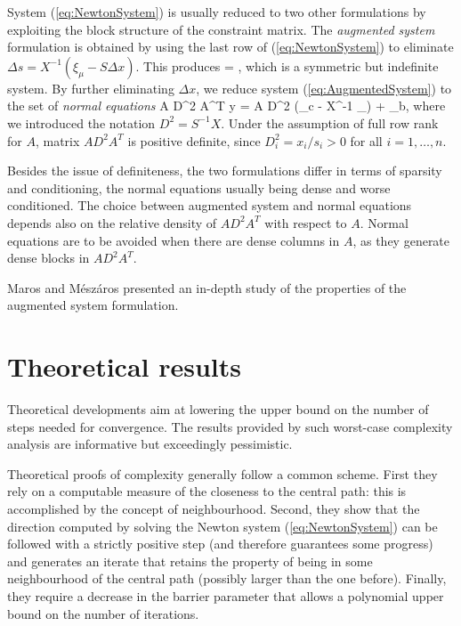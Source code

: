 System (\ref{eq:NewtonSystem}) is usually reduced to two other
formulations by exploiting the block structure of the constraint
matrix.
%
The {\em augmented system} formulation is obtained by using 
the last row of (\ref{eq:NewtonSystem}) to eliminate
$\Delta s = X^{-1} (\xi_\mu - S\Delta x)$.
This produces
%
\be \label{eq:AugmentedSystem}
\left[ \begin{array}{cc}
    -X^{-1}S & A^T \\ A & 0
  \end{array} \right]
 =
\left[ \begin{array}{c}
    \xi_c - X^{-1}\xi_\mu \\ \xi_b
   \end{array} \right],
\ee
which is a symmetric but indefinite system.
%
By further eliminating $\Delta x$, we reduce system 
(\ref{eq:AugmentedSystem}) to the set of {\em normal equations}
%
\be \label{eq:NormalEquations}
  A D^2 A^T \Delta y = A D^2 (\xi_c - X^{-1} \xi_\mu) + \xi_b,
\ee
%
where we introduced the notation $D^2 = S^{-1} X$.
Under the assumption of full row rank for $A$, matrix 
$A D^2 A^T$ is positive definite, since $D^2_i = x_i/s_i > 0$ for
all $i = 1, \ldots, n$.

Besides the issue of definiteness, the two formulations differ in
terms of sparsity and conditioning, the normal equations usually 
being dense and worse conditioned.
The choice between augmented system and normal equations depends also on 
the relative density of $AD^2A^T$ with respect to $A$.
Normal equations are to be avoided when there are dense columns in $A$, 
as they generate dense blocks in $AD^2A^T$.

Maros and M\'esz\'aros \cite{MarosMeszaros} presented an in-depth 
study of the properties of the augmented system formulation.

%
%
\section{Theoretical results}
\label{sec:TheoreticalResults}

Theoretical developments aim at lowering the upper bound on the number 
of steps needed for convergence. The results provided by such worst-case 
complexity analysis are informative but exceedingly pessimistic. 

Theoretical proofs of complexity generally follow a common scheme.
First they rely on a computable measure of the closeness to the central
path: this is accomplished by the concept of neighbourhood. Second,
they show that the direction computed by solving the Newton system
(\ref{eq:NewtonSystem}) can be followed with a strictly positive step
(and therefore guarantees some progress) and generates an iterate 
that retains the property of being in some neighbourhood of the central 
path (possibly larger than the one before). Finally, they require
a decrease in the barrier parameter that allows a polynomial upper
bound on the number of iterations.

